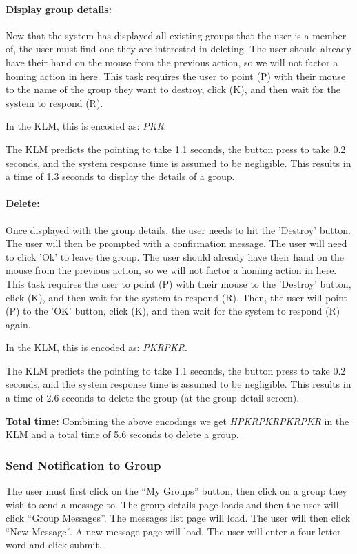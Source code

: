\documentclass[conference]{IEEEtran}
\begin{document}
\paragraph{Display group details:}
Now that the system has displayed all existing groups that the user is a member of, the user must find one they are interested in deleting.
The user should already have their hand on the mouse from the previous action, so we will not factor a homing action in here.
This task requires the user to point (P) with their mouse to the name of the group they want to destroy, click (K), and then wait for the system to respond (R).

In the KLM, this is encoded as: \emph{PKR}.

The KLM predicts the pointing to take 1.1 seconds, the button press to take 0.2 seconds, and the system response time is assumed to be negligible.
This results in a time of 1.3 seconds to display the details of a group.

\paragraph{Delete:}
Once displayed with the group details, the user needs to hit the 'Destroy' button. The user will then be prompted with a confirmation message.  The user will need to click 'Ok' to leave the group. The user should already have their hand on the mouse from the previous action, so we will not factor a homing action in here.
This task requires the user to point (P) with their mouse to the 'Destroy' button, click (K), and then wait for the system to respond (R). Then, the user will point (P) to the 'OK' button, click (K), and then wait for the system to respond (R) again.

In the KLM, this is encoded as: \emph{PKRPKR}.

The KLM predicts the pointing to take 1.1 seconds, the button press to take 0.2 seconds, and the system response time is assumed to be negligible.
This results in a time of 2.6 seconds to delete the group (at the group detail screen).


\textbf{Total time:}
Combining the above encodings we get \emph{HPKRPKRPKRPKR} in the KLM and a total time of 5.6 seconds to delete a group.

\subsubsection{Send Notification to Group}

The user must first click on the ``My Groups'' button, then click on a group they wish to send a message to.  The group details page loads and then the user will click ``Group Messages''.  The messages list page will load. The user will then click ``New Message''.  A new message page will load.  The user will enter a four letter word and click submit.
\end{document}
